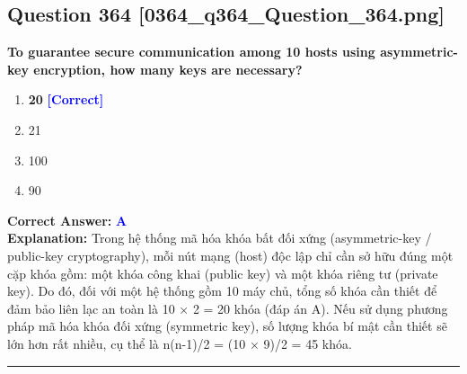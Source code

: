\documentclass[11pt,a4paper]{article}
\begin{document}
\begin{minipage}{\textwidth}
\subsection*{Question 364 \quad \footnotesize{[0364\_q364\_Question\_364.png]}}
\noindent \textbf{To guarantee secure communication among 10 hosts using asymmetric-key encryption, how many keys are necessary?}

\begin{enumerate}[label=\Alph*.]
    \item \textbf{20} \hfill \textcolor{blue}{\textbf{[Correct]}}
    \item 21
    \item 100
    \item 90
\end{enumerate}

\noindent \textbf{Correct Answer:} \textcolor{blue}{\textbf{A}} \\[2pt]
\noindent \textbf{Explanation:} Trong hệ thống mã hóa khóa bất đối xứng (asymmetric-key / public-key cryptography), mỗi nút mạng (host) độc lập chỉ cần sở hữu đúng một cặp khóa gồm: một khóa công khai (public key) và một khóa riêng tư (private key). Do đó, đối với một hệ thống gồm 10 máy chủ, tổng số khóa cần thiết để đảm bảo liên lạc an toàn là 10 × 2 = 20 khóa (đáp án A). Nếu sử dụng phương pháp mã hóa khóa đối xứng (symmetric key), số lượng khóa bí mật cần thiết sẽ lớn hơn rất nhiều, cụ thể là n(n-1)/2 = (10 × 9)/2 = 45 khóa.

\par\vspace{0.3cm}
\hrule
\vspace{0.3cm}
\end{minipage}
\end{document}

